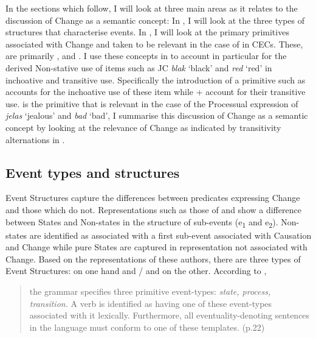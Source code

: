 In the sections which follow, I will look at three main areas as it
relates to the discussion of Change as a semantic concept: In
, I will look at the three types of structures that
characterise events.  In , I will look at the
primary primitives associated with Change and taken to be relevant in
the case of  in CECs.  These, are primarily \CAUSE,
\BECOME and \DO.  I use these concepts in  to account in
particular for the derived Non-stative use of items such as JC
\textit{blak} `black' and \textit{red} `red' in inchoative and
transitive use.  Specifically the introduction of a primitive such as
\BECOME accounts for the inchoative use of these item while \BECOME +
\CAUSE account for their transitive use.  \DO is the primitive that is
relevant in the case of the Processual expression of \textit{jelas}
`jealous' and \textit{bad} `bad',  I summarise this discussion of
Change as a semantic concept by looking at the relevance of Change as
indicated by transitivity alternations in .


\subsection{Event types and structures}\label{sec:4.2.1}

Event Structures capture the differences between predicates expressing
Change and those which do not.  Representations such as those of
\citet{Pustejovsky1988,Pustejovsky1991} and \citet{Grimshaw1990} show
a difference between States and Non-states in the structure of
sub-events (e\textsubscript{1} and e\textsubscript{2}).  Non-states
are identified as associated with a first sub-event associated with
Causation and Change while pure States are captured in representation
not associated with Change.  Based on the representations of these
authors, there are three types of Event Structures:  on one hand
and \slash {} and  on the other.  According to \citet{Pustejovsky1988},

\begin{quote}
the grammar specifies three primitive event-types: \textit{state,
  process, transition.}  A verb is identified as having one of these
event-types associated with it lexically.  Furthermore, all
eventuality-denoting sentences in the language must conform to one of
these templates. (p.22)
\end{quote}

